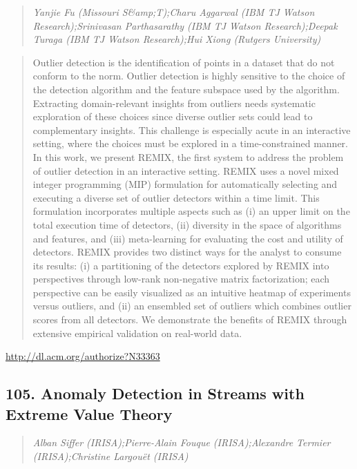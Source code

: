 \documentclass{article}
\begin{document}
\begin{quote}
\footnotesize{\textit{Yanjie Fu (Missouri S\&amp;T);Charu Aggarwal (IBM TJ Watson Research);Srinivasan Parthasarathy (IBM TJ Watson Research);Deepak Turaga (IBM TJ Watson Research);Hui Xiong (Rutgers University)}}

\end{quote}

\begin{quote}
Outlier detection is the identification of points in a dataset that do not conform to the norm. Outlier detection is highly sensitive to the choice of the detection algorithm and the feature subspace used by the algorithm. Extracting domain-relevant insights from outliers needs systematic exploration of these choices since diverse outlier sets could lead to complementary insights. This challenge is especially acute in an interactive setting, where the choices must be explored in a time-constrained manner. In this work, we present REMIX, the first system to address the problem of outlier detection in an interactive setting. REMIX uses a novel mixed integer programming (MIP) formulation for automatically selecting and executing a diverse set of outlier detectors within a time limit. This formulation incorporates multiple aspects such as (i) an upper limit on the total execution time of detectors, (ii) diversity in the space of algorithms and features, and (iii) meta-learning for evaluating the cost and utility of detectors. REMIX provides two distinct ways for the analyst to consume its results: (i) a partitioning of the detectors explored by REMIX into perspectives through low-rank non-negative matrix factorization; each perspective can be easily visualized as an intuitive heatmap of experiments versus outliers, and (ii) an ensembled set of outliers which combines outlier scores from all detectors. We demonstrate the benefits of REMIX through extensive empirical validation on real-world data.
\end{quote}

\href{http://dl.acm.org/authorize?N33363}{http://dl.acm.org/authorize?N33363}

\subsection{105. Anomaly Detection in Streams with Extreme Value Theory}

\begin{quote}
\footnotesize{\textit{Alban Siffer (IRISA);Pierre-Alain Fouque (IRISA);Alexandre Termier (IRISA);Christine Largouët (IRISA)}}

\end{quote}
\end{document}

